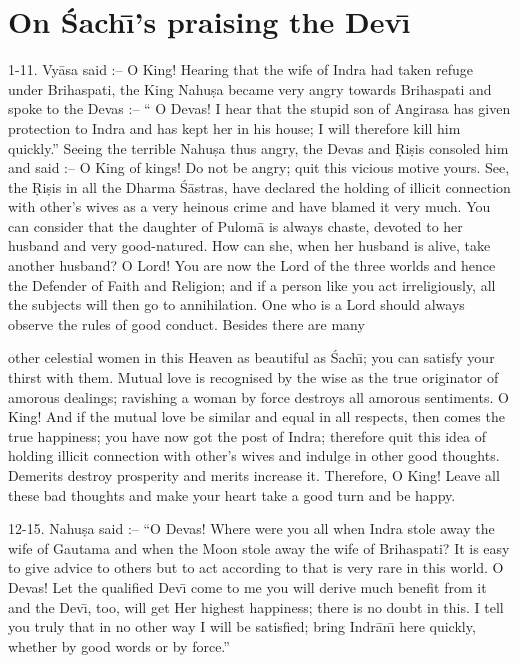 \chapter{On \'Sach\={\i}'s praising the Dev\={\i}}

1-11. Vy\=asa said :-- O King! Hearing that the wife of Indra had taken refuge under Brihaspati, the King Nahu\d{s}a became very angry towards Brihaspati and spoke to the Devas :-- `` O Devas! I hear that the stupid son of Angirasa has given protection to Indra and has kept her in his house; I will therefore kill him quickly.'' Seeing the terrible Nahu\d{s}a thus angry, the Devas and \d{R}i\d{s}is consoled him and said :-- O King of kings! Do not be angry; quit this vicious motive yours. See, the \d{R}i\d{s}is in all the Dharma \'S\=astras, have declared the holding of illicit connection with other's wives as a very heinous crime and have blamed it very much. You can consider that the daughter of Pulom\=a is always chaste, devoted to her husband and very good-natured. How can she, when her husband is alive, take another husband? O Lord! You are now the Lord of the three worlds and hence the Defender of Faith and Religion; and if a person like you act irreligiously, all the subjects will then go to annihilation. One who is a Lord should always observe the rules of good conduct. Besides there are many

other celestial women in this Heaven as beautiful as \'Sach\={\i}; you can satisfy your thirst with them. Mutual love is recognised by the wise as the true originator of amorous dealings; ravishing a woman by force destroys all amorous sentiments. O King! And if the mutual love be similar and equal in all respects, then comes the true happiness; you have now got the post of Indra; therefore quit this idea of holding illicit connection with other's wives and indulge in other good thoughts. Demerits destroy prosperity and merits increase it. Therefore, O King! Leave all these bad thoughts and make your heart take a good turn and be happy.

12-15. Nahu\d{s}a said :-- ``O Devas! Where were you all when Indra stole away the wife of Gautama and when the Moon stole away the wife of Brihaspati? It is easy to give advice to others but to act according to that is very rare in this world. O Devas! Let the qualified Dev\={\i} come to me you will derive much benefit from it and the Dev\={\i}, too, will get Her highest happiness; there is no doubt in this. I tell you truly that in no other way I will be satisfied; bring Indr\=an\={\i} here quickly, whether by good words or by force.''

